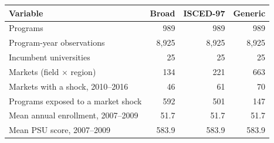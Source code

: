 \begin{tabular}{lrrr}
\toprule
Variable & Broad & ISCED-97 & Generic \\
\midrule
Programs &       989 &       989 &       989 \\
Program-year observations &     8,925 &     8,925 &     8,925 \\
Incumbent universities &        25 &        25 &        25 \\
Markets (field \(\times\) region) &       134 &       221 &       663 \\
Markets with a shock, 2010--2016 &        46 &        61 &        70 \\
Programs exposed to a market shock &       592 &       501 &       147 \\
Mean annual enrollment, 2007--2009 &      51.7 &      51.7 &      51.7 \\
Mean PSU score, 2007--2009 &     583.9 &     583.9 &     583.9 \\
\bottomrule
\end{tabular}
